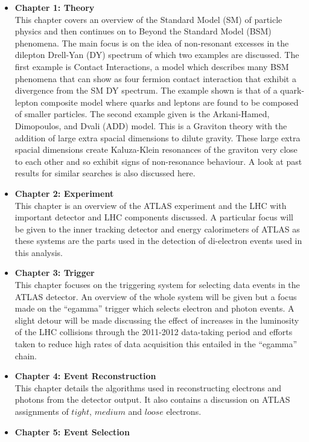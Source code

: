 \begin{itemize}
\item{ 
{\bf Chapter 1: Theory} \\
This chapter covers an overview of the Standard Model (SM) of particle physics and then continues on to Beyond the Standard Model (BSM) phenomena. The main focus is on the idea of non-resonant excesses in the dilepton Drell-Yan (DY) spectrum of which two examples are discussed. The first example is Contact Interactions, a model which describes many BSM phenomena that can show as four fermion contact interaction that exhibit a divergence from the SM DY spectrum. The example shown is that of a quark-lepton composite model where quarks and leptons are found to be composed of smaller particles. The second example given is the Arkani-Hamed, Dimopoulos, and Dvali (ADD) model. This is a Graviton theory with the addition of large extra spacial dimensions to dilute gravity. These large extra spacial dimensions create Kaluza-Klein resonances of the graviton very close to each other and so exhibit signs of non-resonance behaviour. A look at past results for similar searches is also discussed here.
}
\item{ 
{\bf Chapter 2: Experiment} \\
This chapter is an overview of the ATLAS experiment and the LHC with important detector and LHC components discussed. A particular focus will be given to the inner tracking detector and energy calorimeters of ATLAS as these systems are the parts used in the detection of di-electron events used in this analysis.
}
\item{ 
{\bf Chapter 3: Trigger} \\
This chapter focuses on the triggering system for selecting data events in the ATLAS detector. An overview of the whole system will be given but a focus made on the ``egamma'' trigger which selects electron and photon events. A slight detour will be made discussing the effect of increases in the luminosity of the LHC collisions through the 2011-2012 data-taking period and efforts taken to reduce high rates of data acquisition this entailed in the ``egamma'' chain.
}
\item{ 
{\bf Chapter 4: Event Reconstruction} \\
This chapter details the algorithms used in reconstructing electrons and photons from the detector output. It also contains a discussion on ATLAS assignments of $tight$, $medium$ and $loose$ electrons.
}
\item{ 
{\bf Chapter 5: Event Selection} \\
}
\end{itemize}
